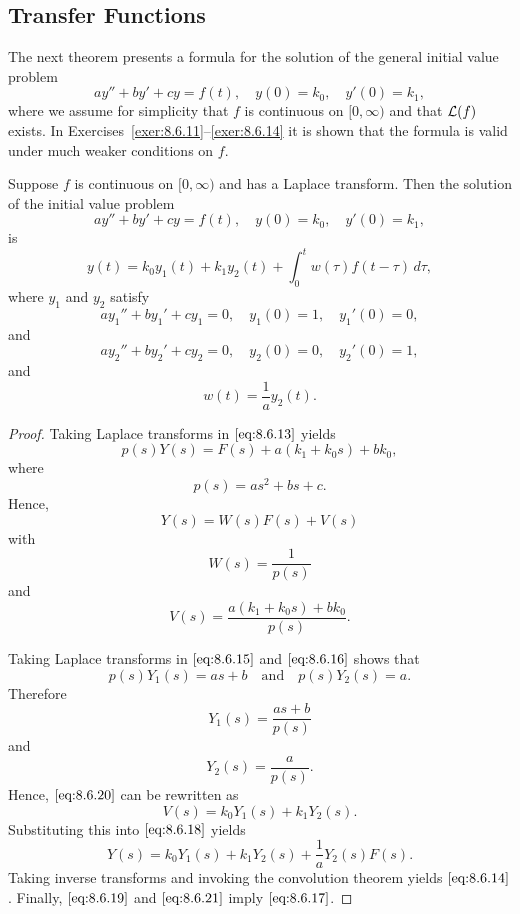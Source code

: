 \documentclass{ximera}
\begin{document}
\subsection*{Transfer Functions}

The next theorem presents a formula for the solution of
the general initial value problem
$$
ay''+by'+cy=f(t),\quad y(0)=k_0,\quad y'(0)=k_1,
$$
where we assume for simplicity that $f$ is continuous on $[0,\infty)$
and that ${\cal L}(f)$ exists. 
In Exercises~\ref{exer:8.6.11}--\ref{exer:8.6.14} it is shown that the formula is valid under much weaker conditions on $f$.

\begin{theorem}\label{thmtype:8.6.3}
Suppose $f$ is continuous on $[0,\infty)$ and has a Laplace
transform$.$ Then the solution of the initial value problem
\begin{equation}\label{eq:8.6.13}
ay''+by'+cy=f(t),\quad y(0)=k_0,\quad y'(0)=k_1,
\end{equation}
is
\begin{equation}\label{eq:8.6.14}
y(t)=k_0y_1(t)+k_1y_2(t)+\int_0^tw(\tau)f(t-\tau)\,d\tau,
\end{equation}
where $y_1$  and $y_2$  satisfy
\begin{equation}\label{eq:8.6.15}
ay_1''+by_1'+cy_1=0,\quad y_1(0)=1,\quad y_1'(0)=0,
\end{equation}
and
\begin{equation}\label{eq:8.6.16}
ay_2''+by_2'+cy_2=0,\quad y_2(0)=0,\quad y_2'(0)=1,
\end{equation}
and
\begin{equation}\label{eq:8.6.17}
w(t)=\frac{1}{a}y_2(t).
\end{equation}
\end{theorem}

\begin{proof}
Taking Laplace transforms in   $\eqref{eq:8.6.13}$ yields
 $$
p(s)Y(s)=F(s)+a(k_1+k_0s)+bk_0,
$$
where
$$
p(s)=as^2+bs+c.
$$
Hence,
\begin{equation}\label{eq:8.6.18}
Y(s)=W(s)F(s)+V(s)
\end{equation}
with
\begin{equation}\label{eq:8.6.19}
W(s)=\frac{1}{p(s)}
\end{equation}
and
\begin{equation}\label{eq:8.6.20}
V(s)=\frac{a(k_1+k_0s)+bk_0}{p(s)}.
\end{equation}

Taking Laplace transforms in  $\eqref{eq:8.6.15}$ and  $\eqref{eq:8.6.16}$ shows that
$$
p(s)Y_1(s)=as+b\quad\mbox{and}\quad p(s)Y_2(s)=a.
$$
Therefore
$$
Y_1(s)=\frac{as+b}{p(s)}
$$
and
\begin{equation}\label{eq:8.6.21}
 Y_2(s)=\frac{a}{p(s)}.
\end{equation}
Hence, $\eqref{eq:8.6.20}$ can be rewritten as
$$
V(s)=k_0Y_1(s)+k_1Y_2(s).
$$
Substituting this into $\eqref{eq:8.6.18}$ yields
$$
Y(s)=k_0Y_1(s)+k_1Y_2(s)+\frac{1}{a}Y_2(s)F(s).
$$
Taking inverse transforms and invoking the convolution theorem yields $\eqref{eq:8.6.14}$. Finally, $\eqref{eq:8.6.19}$ and $\eqref{eq:8.6.21}$ imply  $\eqref{eq:8.6.17}$.
\end{proof}
\end{document}
